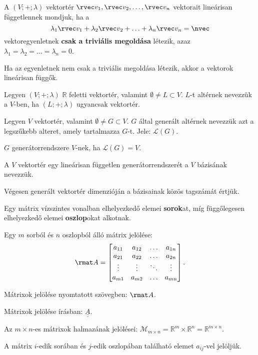 \documentclass[a4paper, 12pt]{scrartcl}
\begin{document}
\begin{definition}
  A $(V; +; \lambda)$ vektortér $\rvec v_1, \rvec v_2, \ldots, \rvec v_n$
  vektorait lineárisan függetlennek mondjuk, ha a
  $$
    \lambda_1 \rvec v_1
    + \lambda_2 \rvec v_2
    + \ldots
    + \lambda_n \rvec v_n
    = \nvec
  $$
  vektoregyenletnek \textbf{csak a triviális megoldása} létezik, azaz
  $\lambda_1 = \lambda_2 = \ldots = \lambda_n = 0$.

  Ha az egyenletnek nem csak a triviális megoldása létezik, akkor a vektorok
  lineárisan függők.
\end{definition}

\begin{definition}[Altér]
  Legyen $(V; +; \lambda)$ $\mathbb R$ feletti vektortér, valamint
  $\emptyset \neq L \subset V$. $L$-t altérnek nevezzük a $V$-ben, ha
  $(L; +; \lambda)$ ugyancsak vektortér.
\end{definition}

\begin{definition}[Generátorrendszer]
  Legyen $V$ vektortér, valamint $\emptyset \neq G \subset V$. $G$ által
  generált altérnek nevezzük azt a legszűkebb alteret, amely tartalmazza $G$-t.
  Jele: $\mathcal L(G)$.

  $G$ generátorrendszere $V$-nek, ha $\mathcal L(G) = V$.
\end{definition}

\begin{definition}[Bázis]
  A $V$ vektortér egy lineárisan független generátorrendszerét a $V$
  bázisának nevezzük.
\end{definition}

\begin{definition}
  Végesen generált vektortér dimenzióján a bázisainak közös tagszámát értjük.
\end{definition}

\begin{definition}[Mátrix]
  Egy mátrix vízszintes vonalban elhelyezkedő elemei \textbf{sorok}at,
  míg függőlegesen elhelyezkedő elemei \textbf{oszlop}okat alkotnak.

  Egy $m$ sorból és $n$ oszlopból álló mátrix jelölése:
  $$
    \rmat A = \begin{bmatrix}
      a_{11} & a_{12} & \ldots & a_{1n} \\
      a_{21} & a_{22} & \ldots & a_{2n} \\
      \vdots & \vdots & \ddots & \vdots \\
      a_{m1} & a_{m2} & \ldots & a_{mn}
    \end{bmatrix}
    \text.
  $$

  Mátrixok jelölése nyomtatott szövegben: $\rmat A$.

  Mátrixok jelölése írásban: $\underline{\underline A}$.

  Az $m \times n$-es mátrixok halmazának jelölései: $\mathcal M_{m \times n}
    = \mathbb R^m \times \mathbb R^n = \mathbb R^{m \times n}$.

  A mátrix $i$-edik sorában és $j$-edik oszlopában található elemet
  $a_{ij}$-vel jelöljük.
\end{definition}
\end{document}
